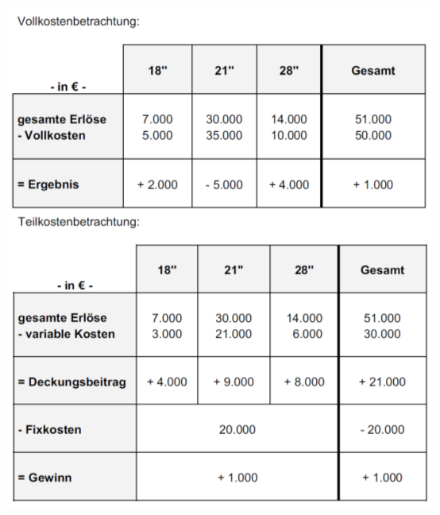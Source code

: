 \documentclass[a4paper,11pt, twoside]{article}
\begin{document}
\begin{figure}[h]
 \begin{center}
   \includegraphics[scale=0.5]{bilder/beispiel_vollteilkostenrechnung2.png}
 \end{center}
\end{figure}
\end{document}
